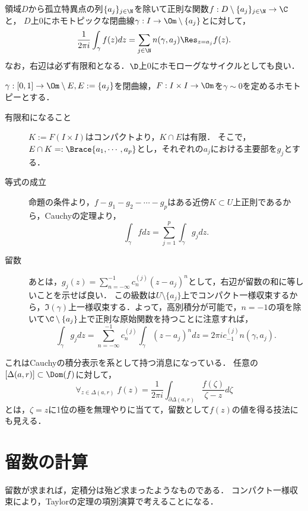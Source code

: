 \documentclass[uplatex, dvipdfmx]{jsreport}
\begin{document}
\begin{theorem}[留数定理]\label{thm-residue}
    領域$D$から孤立特異点の列$\{a_j\}_{j\in\N}$を除いて正則な関数$f:D\setminus\{a_j\}_{j\in\N}\to\C$と，
    $D$上$0$にホモトピックな閉曲線$\gamma:I\to\Om\setminus\{a_j\}$とに対して，
    \[\frac{1}{2\pi i}\int_\gamma f(z)dz=\sum_{j\in\N}n(\gamma,a_j)\Res_{z=a_j}f(z).\]
    なお，右辺は必ず有限和となる．$\D$上$0$にホモローグなサイクルとしても良い．
\end{theorem}
\begin{Proof}
    $\gamma:[0,1]\to\Om\setminus E,E:=\{a_j\}$を閉曲線，$F:I\times I\to\Om$を$\gamma\sim0$を定めるホモトピーとする．
    \begin{description}
        \item[有限和になること] $K:=F(I\times I)$はコンパクトより，$K\cap E$は有限．
        そこで，$E\cap K=:\Brace{a_1,\cdots,a_p}$とし，それぞれの$a_j$における主要部を$g_j$とする．
        \item[等式の成立] 命題の条件より，$f-g_1-g_2-\cdots-g_p$はある近傍$K\subset U$上正則であるから，Cauchyの定理より，
        \[\int_\gamma fdz=\sum_{j=1}^p\int_\gamma g_jdz.\]
        \item[留数] あとは，$g_j(z)=\sum_{n=-\infty}^{-1}c_n^{(j)}(z-a_j)^n$として，右辺が留数の和に等しいことを示せば良い．
        この級数は$U\setminus\{a_j\}$上でコンパクト一様収束するから，$\Im(\gamma)$上一様収束する．よって，高別積分が可能で，$n=-1$の項を除いて$\C\setminus\{a_j\}$上で正則な原始関数を持つことに注意すれば，
        \[\int_\gamma g_jdz=\sum_{n=-\infty}^{-1}c_n^{(j)}\int_\gamma(z-a_j)^ndz=2\pi ic_{-1}^{(j)}n(\gamma,a_j).\]
    \end{description}
\end{Proof}
\begin{remarks}
    これはCauchyの積分表示を系として持つ消息になっている．
    任意の$[\Delta(a,r)]\subset\Dom(f)$に対して，
    \[\forall_{z\in\Delta(a,r)}\;f(z)=\frac{1}{2\pi i}\int_{\partial\Delta(a,r)}\frac{f(\zeta)}{\zeta-z}d\zeta\]
    とは，$\zeta=z$に1位の極を無理やりに当てて，留数として$f(z)$の値を得る技法にも見える．
\end{remarks}

\section{留数の計算}

\begin{tcolorbox}[colframe=ForestGreen, colback=ForestGreen!10!white,breakable,colbacktitle=ForestGreen!40!white,coltitle=black,fonttitle=\bfseries\sffamily,
title=]
    留数が求まれば，定積分は殆ど求まったようなものである．
    コンパクト一様収束により，Taylorの定理の項別演算で考えることになる．
\end{tcolorbox}
\end{document}
